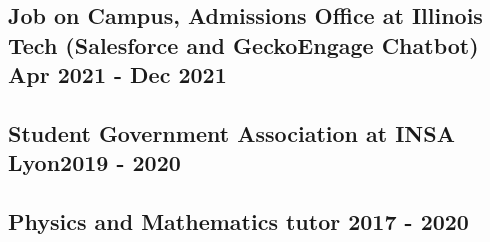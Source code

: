 \small
	
\subsection{{ Job on Campus, Admissions Office at Illinois Tech (Salesforce and GeckoEngage Chatbot) \hfill Apr 2021 - Dec 2021}}	

	
\subsection{{ Student Government Association at INSA Lyon\hfill 2019 - 2020}}	

	
\subsection{{ Physics and Mathematics tutor \hfill 2017 - 2020}}	


